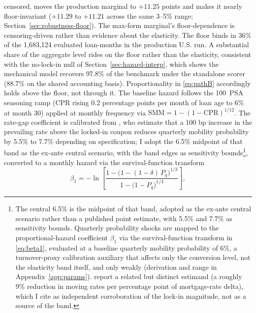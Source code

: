 \documentclass[12pt]{article}
\begin{document}
censored, moves the production marginal to $+11.25$ points and makes it nearly floor-invariant ($+11.29$ to $+11.21$ across the same 3--5\% range; Section~\ref{sec:robustness-floor}). The max-form marginal's floor-dependence is censoring-driven rather than evidence about the elasticity. The floor binds in 36\% of the 1,683,124 evaluated loan-months in the production U.S. run. A substantial share of the aggregate level rides on the floor rather than the elasticity, consistent with the no-lock-in null of Section~\ref{sec:hazard-interp}, which shows the mechanical model recovers 97.8\% of the benchmark under the standalone scorer (88.7\% on the shared accounting basis). Proportionality in \eqref{eq:pathB} accordingly holds above the floor, not through it. The baseline hazard follows the 100~PSA seasoning ramp (CPR rising 0.2 percentage points per month of loan age to 6\% at month 30) applied at monthly frequency via $\mathrm{SMM} = 1-(1-\mathrm{CPR})^{1/12}$. The rate-gap coefficient is calibrated from \citet{liebersohn2024}, who estimate that a 100 bp increase in the prevailing rate above the locked-in coupon reduces quarterly mobility probability by 5.5\% to 7.7\% depending on specification; I adopt the 6.5\% midpoint of that band as the ex-ante central scenario, with the band edges as sensitivity bounds\footnote{The central 6.5\% is the midpoint of that band, adopted as the ex-ante central scenario rather than a published point estimate, with 5.5\% and 7.7\% as sensitivity bounds. Quarterly probability shocks are mapped to the proportional-hazard coefficient $\beta_1$ via the survival-function transform in \eqref{eq:beta1}, evaluated at a baseline quarterly mobility probability of 6\%, a turnover-proxy calibration auxiliary that affects only the conversion level, not the elasticity band itself, and only weakly (derivation and range in Appendix~\ref{app:params}). \citet{fonseca2024} report a related but distinct estimand (a roughly 9\% reduction in moving rates per percentage point of mortgage-rate delta), which I cite as independent corroboration of the lock-in magnitude, not as a source of the band.}, converted to a monthly hazard via the survival-function transform
\begin{equation}\label{eq:beta1}
\beta_1 = -\ln\!\left[\frac{1-\big(1-(1-\delta)\,P_q\big)^{1/3}}{1-\big(1-P_q\big)^{1/3}}\right],
\end{equation}
\end{document}
